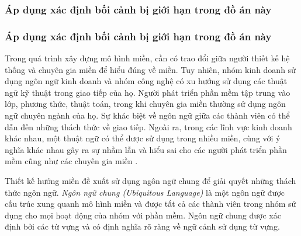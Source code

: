 \subsubsection{Áp dụng xác định bối cảnh bị giới hạn trong đồ án này}

\subsubsection{Áp dụng xác định bối cảnh bị giới hạn trong đồ án này}











Trong quá trình xây dựng mô hình miền, cần có trao đổi giữa người thiết kế hệ thống và chuyên gia  miền    để hiểu đúng về miền. Tuy nhiên, nhóm kinh doanh sử dụng ngôn ngữ kinh doanh và nhóm công nghệ có xu hướng sử dụng các thuật ngữ kỹ thuật trong giao tiếp của họ. Người phát triển phần mềm tập trung vào lớp, phương thức, thuật toán, trong khi chuyên gia  miền    thường sử dụng ngôn ngữ chuyên ngành của họ. Sự khác biệt về ngôn ngữ giữa các thành viên có thể dẫn đến những thách thức về giao tiếp. Ngoài ra, trong các lĩnh vực kinh doanh khác nhau, một thuật ngữ có thể được sử dụng trong nhiều miền, cùng với ý nghĩa khác nhau gây ra sự nhầm lẫn và hiểu sai cho các người phát triển phần mềm cũng như các chuyên gia  miền   .

Thiết kế hướng miền đề xuất sử dụng ngôn ngữ chung để giải quyết những thách thức ngôn ngữ. \emph{Ngôn ngữ chung (Ubiquitous Language)} là một ngôn ngữ được cấu trúc xung quanh mô hình miền và được tất cả các thành viên trong nhóm sử dụng cho mọi hoạt động của nhóm với phần mềm. Ngôn ngữ chung được xác định bởi các từ vựng và có định nghĩa rõ ràng về ngữ cảnh sử dụng từ vựng.

